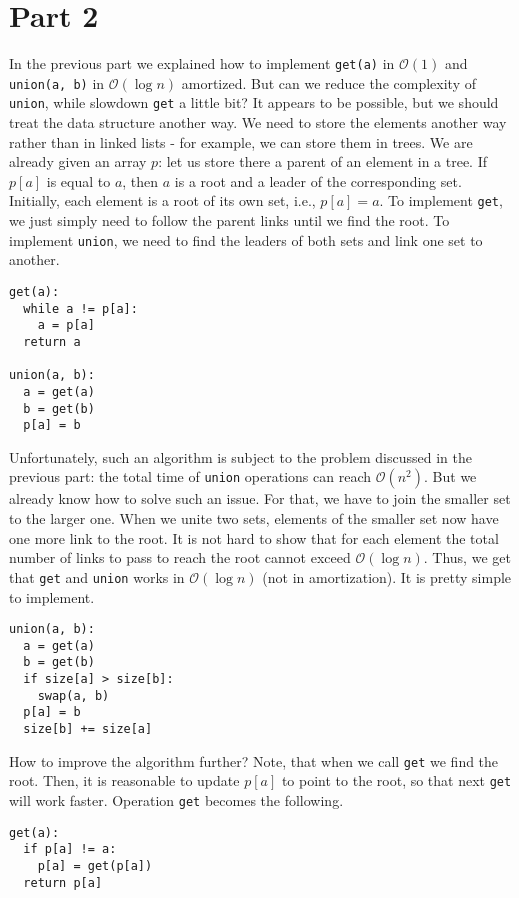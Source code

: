 \documentclass[11pt]{article}
\begin{document}
\section{Part 2}
\label{sec:orga4cae89}
In the previous part we explained how to implement \texttt{get(a)} in \(\mathcal{O}(1)\) and \texttt{union(a, b)}
in \(\mathcal{O}(\log n)\) amortized. But can we reduce the complexity of \texttt{union}, while slowdown
\texttt{get} a little bit? It appears to be possible, but we should treat the data structure another
way. We need to store the elements another way rather than in linked lists - for example, we can
store them in trees. We are already given an array \(p\): let us store there a parent of an element
in a tree. If \(p[a]\) is equal to \(a\), then \(a\) is a root and a leader of the corresponding
set. Initially, each element is a root of its own set, i.e., \(p[a] = a\). To implement \texttt{get}, we
just simply need to follow the parent links until we find the root. To implement \texttt{union}, we need
to find the leaders of both sets and link one set to another.
\begin{verbatim}
get(a):
  while a != p[a]:
    a = p[a]
  return a

union(a, b):
  a = get(a)
  b = get(b)
  p[a] = b
\end{verbatim}

Unfortunately, such an algorithm is subject to the problem discussed in the previous part: the
total time of \texttt{union} operations can reach \(\mathcal{O}(n^2)\). But we already know how to solve
such an issue. For that, we have to join the smaller set to the larger one. When we unite two
sets, elements of the smaller set now have one more link to the root. It is not hard to show that
for each element the total number of links to pass to reach the root cannot exceed
\(\mathcal{O}(\log n)\). Thus, we get that \texttt{get} and \texttt{union} works in \(\mathcal{O}(\log n)\) (not in
amortization). It is pretty simple to implement.
\begin{verbatim}
union(a, b):
  a = get(a)
  b = get(b)
  if size[a] > size[b]:
    swap(a, b)
  p[a] = b
  size[b] += size[a]
\end{verbatim}

How to improve the algorithm further? Note, that when we call \texttt{get} we find the root. Then, it is
reasonable to update \(p[a]\) to point to the root, so that next \texttt{get} will work faster. Operation
\texttt{get} becomes the following.
\begin{verbatim}
get(a):
  if p[a] != a:
    p[a] = get(p[a])
  return p[a]
\end{verbatim}
\end{document}
